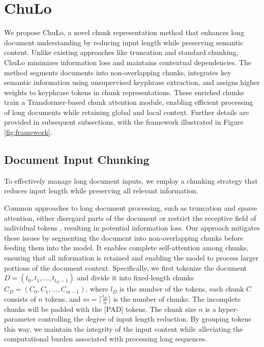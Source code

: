 \documentclass[11pt]{article}
\begin{document}
\section{ChuLo}
We propose ChuLo, a novel chunk representation method that enhances long document understanding by reducing input length while preserving semantic content. Unlike existing approaches like truncation and standard chunking, ChuLo minimizes information loss and maintains contextual dependencies. The method segments documents into non-overlapping chunks, integrates key semantic information using unsupervised keyphrase extraction, and assigns higher weights to keyphrase tokens in chunk representations. These enriched chunks train a Transformer-based chunk attention module, enabling efficient processing of long documents while retaining global and local context. Further details are provided in subsequent subsections, with the framework illustrated in Figure \ref{fig:framework}.



\subsection{Document Input Chunking}
To effectively manage long document inputs, we employ a chunking strategy that reduces input length while preserving all relevant information.


Common approaches to long document processing, such as truncation and sparse attention, either disregard parts of the document\citep{lewis2020bart,park2022efficient} or restrict the receptive field of individual tokens \citep{beltagy2020longformer,zaheer2020big,brown2020language}, resulting in potential information loss.
Our approach mitigates these issues by segmenting the document into non-overlapping chunks before feeding them into the model. It enables complete self-attention among chunks, ensuring that all information is retained and enabling the model to process larger portions of the document context. Specifically, we first tokenize the document $D = (t_0, t_1, \dots, t_{l_{D}-1})$ and divide it into fixed-length chunks $C_D = (C_0, C_1, \dots, C_{m-1})$, where $l_{D}$ is the number of the tokens, each chunk $C$ consists of $n$ tokens, and $m= \lceil {\frac{l_{D}}{n}} \rceil$ is the number of chunks. The incomplete chunks will be padded with the [PAD] tokens. The chunk size $n$ is a hyper-parameter controlling the degree of input length reduction. By grouping tokens this way, we maintain the integrity of the input content while alleviating the computational burden associated with processing long sequences.
\end{document}
